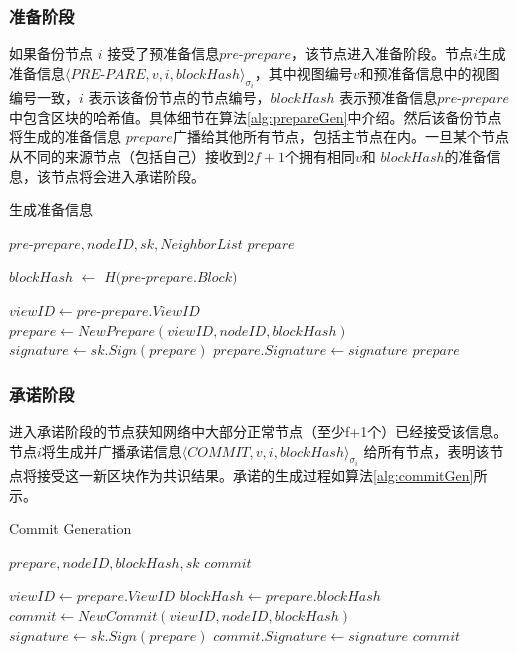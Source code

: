 \subsubsection{准备阶段}

如果备份节点 $i$ 接受了预准备信息$pre$-$prepare$，该节点进入准备阶段。节点$i$生成准备信息$\langle PRE$-$PARE, v, i, blockHash\rangle_{\sigma_{i}}$，其中视图编号$v$和预准备信息中的视图编号一致，$i$ 表示该备份节点的节点编号，$blockHash$ 表示预准备信息$pre$-$prepare$中包含区块的哈希值。具体细节在算法\ref{alg:prepareGen}中介绍。然后该备份节点将生成的准备信息 $prepare$广播给其他所有节点，包括主节点在内。一旦某个节点从不同的来源节点（包括自己）接收到$2f+1$个拥有相同$v$和 $blockHash$的准备信息，该节点将会进入承诺阶段。

 \begin{algorithm}
 \caption{生成准备信息}
   \begin{algorithmic}[H]\label{alg:prepareGen}
   \renewcommand{\algorithmicrequire}{\textbf{Input:}}
   \renewcommand{\algorithmicensure}{\textbf{Output:}}
   \REQUIRE $pre$-$prepare, nodeID, sk, NeighborList$
   \ENSURE  $prepare$

    \STATE $blockHash$ $\gets$ $H(pre$-$prepare.Block)$

    \STATE $viewID \gets pre$-$prepare.ViewID$
    \STATE $prepare \gets NewPrepare(viewID, nodeID, blockHash)$
    \STATE $signature \gets sk.Sign(prepare)$
    \STATE $prepare.Signature \gets signature$
   \RETURN $prepare$
   \end{algorithmic}
 \end{algorithm}

\subsubsection{承诺阶段}

进入承诺阶段的节点获知网络中大部分正常节点（至少f+1个）已经接受该信息。节点$i$将生成并广播承诺信息$\langle COMMIT, v, i, blockHash \rangle_{\sigma_{i}}$ 给所有节点，表明该节点将接受这一新区块作为共识结果。承诺的生成过程如算法\ref{alg:commitGen}所示。

 \begin{algorithm}
 \caption{Commit Generation}
   \begin{algorithmic}[H]\label{alg:commitGen}
   \renewcommand{\algorithmicrequire}{\textbf{Input:}}
   \renewcommand{\algorithmicensure}{\textbf{Output:}}
   \REQUIRE $prepare, nodeID, blockHash, sk$
   \ENSURE  $commit$

    \STATE $viewID \gets prepare.ViewID$
    \STATE $blockHash \gets prepare.blockHash$
    \STATE $commit \gets NewCommit(viewID, nodeID, blockHash)$
    \STATE $signature \gets sk.Sign(prepare)$
    \STATE $commit.Signature \gets signature$
   \RETURN $commit$
   \end{algorithmic}
 \end{algorithm}

